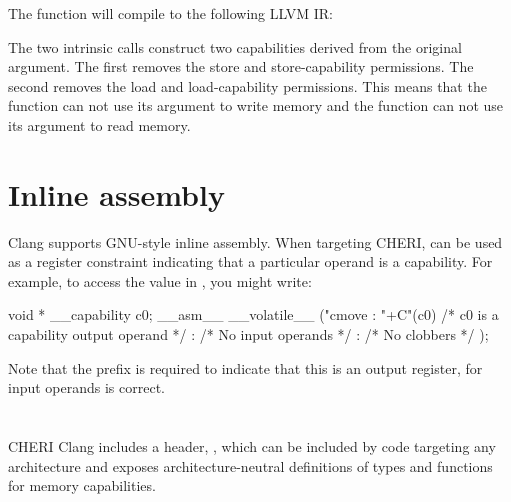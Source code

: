 The  function will compile to the following LLVM IR:


The two intrinsic calls construct two capabilities derived from the original argument.
The first removes the store and store-capability permissions.
The second removes the load and load-capability permissions.
This means that the  function can not use its argument to write memory and the  function can not use its argument to read memory.

\section{Inline assembly}

Clang supports GNU-style inline assembly.
When targeting CHERI,  can be used as a register constraint indicating that a particular operand is a capability.
For example, to access the value in , you might write:

\begin{csnippet}
void * __capability c0;
__asm__ __volatile__ ("cmove %
	: "+C"(c0) /* c0 is a capability output operand */
	: /* No input operands */
	: /* No clobbers */
	);
\end{csnippet}

Note that the \ccode{+} prefix is required to indicate that this is an output register, for input operands  is correct.

\section{}

CHERI Clang includes a header, , which can be included by code targeting any architecture and exposes architecture-neutral definitions of types and functions for memory capabilities.

